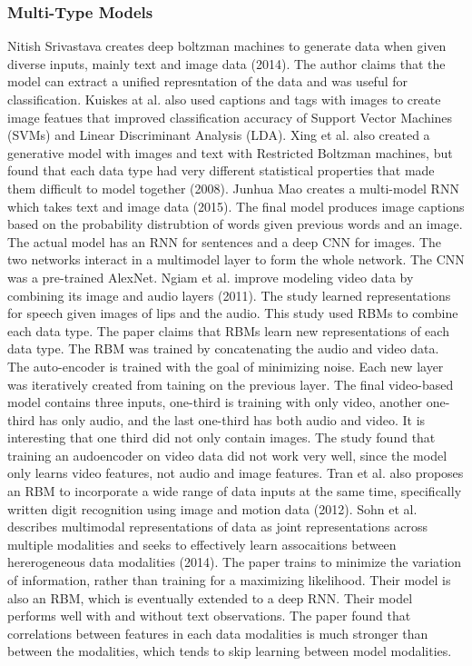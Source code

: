 \subsubsection{Multi-Type Models}
Nitish Srivastava creates deep boltzman machines to generate data when given diverse inputs, mainly text and image data (2014).  The author claims that the model can extract a unified represntation of the data and was useful for classification.  Kuiskes at al. also used captions and tags with images to create image featues that improved classification accuracy of Support Vector Machines (SVMs) and Linear Discriminant Analysis (LDA).  Xing et al. also created a generative model with images and text with Restricted Boltzman machines, but found that each data type had very different statistical properties that made them difficult to model together (2008).
 Junhua Mao creates a multi-model RNN which takes text and image data (2015).  The final model produces image captions based on the probability distrubtion of words given previous words and an image.  The actual model has an RNN for sentences and a deep CNN for images.  The two networks interact in a multimodel layer to form the whole network.  The CNN was a pre-trained AlexNet.
 Ngiam et al. improve modeling video data by combining its image and audio layers (2011).  The study learned representations for speech given images of lips and the audio.  This study used RBMs to combine each data type.  The paper claims that RBMs learn new representations of each data type.  The RBM was trained by concatenating the audio and video data.  The auto-encoder is trained with the goal of minimizing noise.  Each new layer was iteratively created from taining on the previous layer.  The final video-based model contains three inputs, one-third is training with only video, another one-third has only audio, and the last one-third has both audio and video.  It is interesting that one third did not only contain images.  The study found that training an audoencoder on video data did not work very well, since the model only learns video features, not audio and image features.
 Tran et al. also proposes an RBM to incorporate a wide range of data inputs at the same time, specifically written digit recognition using image and motion data (2012).  Sohn et al. describes multimodal representations of data as joint representations across multiple modalities and seeks to effectively learn assocaitions between hererogeneous data modalities (2014). The paper trains to minimize the variation of information, rather than training for a maximizing likelihood.  Their model is also an RBM, which is eventually extended to a deep RNN.  Their model performs well with and without text observations.  The paper found that correlations between features in each data modalities is much stronger than between the modalities, which tends to skip learning between model modalities.











